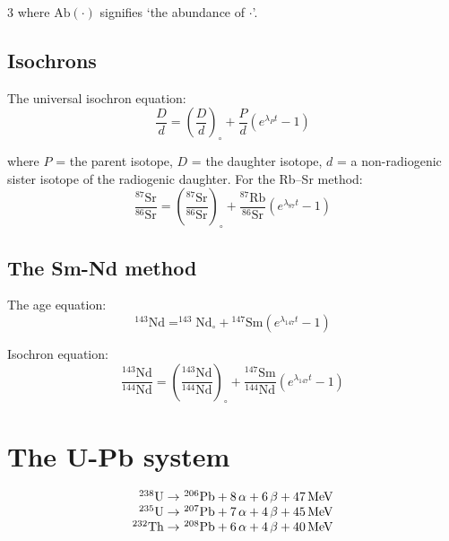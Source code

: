 \documentclass{article}
\begin{document}
\begin{multicols}{3}
where $\mbox{Ab}(\cdot)$ signifies `the abundance of $\cdot$'.

\subsection{Isochrons}
\label{sec:isochrons}

The universal isochron equation:
\begin{equation}
\frac{D}{d} = \left(\frac{D}{d}\right)_\circ + \frac{P}{d} (e^{\lambda_{P} t} - 1)
\label{eq:isochron}
\end{equation}

where $P$ = the parent isotope, $D$ = the daughter isotope, $d$ = a
non-radiogenic sister isotope of the radiogenic daughter. For the
Rb--Sr method:
\begin{equation}
\frac{^{87}\mbox{Sr}}{^{86}\mbox{Sr}} =
\left(\frac{^{87}\mbox{Sr}}{^{86}\mbox{Sr}}\right)_\circ +
\frac{^{87}\mbox{Rb}}{^{86}\mbox{Sr}} (e^{\lambda_{87} t} - 1)
\label{eq:87Sr86Sr}
\end{equation}

\subsection{The Sm-Nd method}
\label{sec:Sm-Nd}

The age equation:
\begin{equation}
^{143}\mbox{Nd} = ^{143}\mbox{Nd}_\circ + {}^{147}\mbox{Sm} (e^{\lambda_{147} t} - 1)
\label{eq:144Nd*}
\end{equation}

Isochron equation:
\begin{equation}
\frac{^{143}\mbox{Nd}}{^{144}\mbox{Nd}} =
\left(\frac{^{143}\mbox{Nd}}{^{144}\mbox{Nd}}\right)_{\circ} +
\frac{^{147}\mbox{Sm}}{^{144}\mbox{Nd}} \left(e^{\lambda_{147}t} -
1\right)
\label{eq:143Nd147Nd}
\end{equation}

\section{The U-Pb system}
\label{sec:U-Pb}

\begin{equation}
\begin{array}{r@{~}l}
^{238}\mbox{U} \rightarrow & {}^{206}\mbox{Pb} + 8\,\alpha + 6\,\beta + 47\,\mbox{MeV} \\ 
^{235}\mbox{U} \rightarrow & {}^{207}\mbox{Pb} + 7\,\alpha + 4\,\beta + 45\,\mbox{MeV} \\
^{232}\mbox{Th} \rightarrow & {}^{208}\mbox{Pb} + 6\,\alpha + 4\,\beta + 40\,\mbox{MeV} 
\end{array}
\label{eq:UThdecay}
\end{equation}


\end{multicols}
\end{document}
